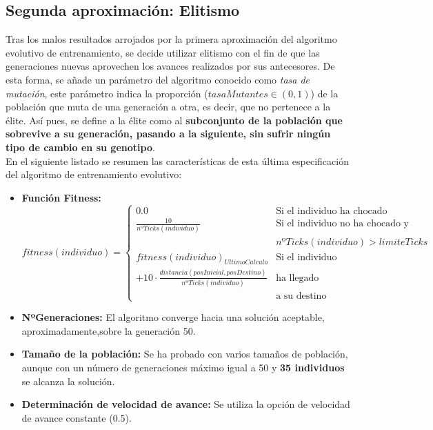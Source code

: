 \documentclass[12pt,spanish]{article}
\begin{document}
\subsection{Segunda aproximación: Elitismo}
Tras los malos resultados arrojados por la primera aproximación del algoritmo evolutivo de entrenamiento, se decide utilizar elitismo con el fin de que las generaciones nuevas aprovechen los avances realizados por sus antecesores. De esta forma, se añade un parámetro del algoritmo conocido como \textit{tasa de mutación}, este parámetro indica la proporción ($tasaMutantes \in (0,1)$) de la población que muta de una generación a otra, es decir, que no pertenece a la élite. Así pues, se define a la élite como al \textbf{subconjunto de la población que sobrevive a su generación, pasando a la siguiente, sin sufrir ningún tipo de cambio en su genotipo}.\\
En el siguiente listado se resumen las características de esta última especificación del algoritmo de entrenamiento evolutivo:\\
\begin{itemize}
	\item{\textbf{Función Fitness:} }\\
	$$fitness(individuo) = \left\{
		\begin{array}{ll}
			0.0 & \textrm{Si el individuo ha chocado}\\
			\frac{10}{nºTicks(individuo)} & \textrm{Si el individuo no ha chocado y}\\
			 & nºTicks(individuo)>limiteTicks\\
			fitness(individuo)_{UltimoCalculo} & \textrm{Si el individuo} \\
			 + 10\cdot \frac{distancia(posInicial,posDestino)}{nºTicks(individuo)} & \textrm{ha llegado}\\
			 & \textrm{a su destino}
		\end{array}
	\right.$$
	\item{\textbf{NºGeneraciones: }} El algoritmo converge hacia una solución aceptable, aproximadamente,sobre la generación 50.
	\item{\textbf{Tamaño de la población: }} Se ha probado con varios tamaños de población, aunque con un número de generaciones máximo igual a 50 y \textbf{35 individuos} se alcanza la solución.
	\item{\textbf{Determinación de velocidad de avance: }} Se utiliza la opción de velocidad de avance constante (0.5).
\end{itemize}
\end{document}
